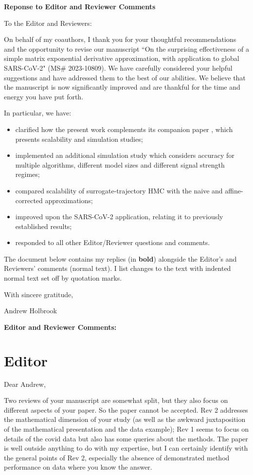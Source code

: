 \documentclass[12pt]{article}
\def\paperTitle{On the surprising effectiveness of a simple matrix exponential derivative approximation, with application to global SARS-CoV-2}
\def\paperID{MS\# 2023-10809}
\begin{document}


\centerline{\large \bf Reponse to Editor and Reviewer Comments}

To the Editor and Reviewers:

On behalf of my coauthors, I thank you for your thoughtful recommendations and the opportunity to revise our manuscript ``\paperTitle" (\paperID).
We have carefully considered your helpful suggestions and have addressed them to the best of our abilities.  We believe that the manuscript is now significantly improved and are thankful for the time and energy you have put forth.

In particular, we have:
\begin{itemize}
	\item clarified how the present work complements its companion paper \citet{magee2023random}, which presents scalability and simulation studies;
	
	\item implemented an additional simulation study which considers accuracy for multiple algorithms, different model sizes and different signal strength regimes;
	
    \item compared scalability of surrogate-trajectory HMC with the naive and affine-corrected approximations;
    
    \item improved upon the SARS-CoV-2 application, relating it to previously established results;
	
	\item responded to all other Editor/Reviewer questions and comments.
\end{itemize}


The document below contains my replies (in \textbf{bold}) alongside the Editor's and Reviewers' comments (normal text).  I list changes to the text with indented normal text set off by quotation marks.

With sincere gratitude,

Andrew Holbrook
\clearpage


{\Large \bf Editor and Reviewer Comments:}


\section*{Editor}

Dear Andrew, 

Two reviews of your manuscript are somewhat split, but they also focus on different aspects of your paper. So the paper cannot be accepted. Rev 2 addresses the mathematical dimension of your study (as well as the awkward juxtaposition of the mathematical presentation and the data example); Rev 1 seems to focus on details of the covid data but also has some queries about the methods. The paper is well outside anything to do with my expertise, but I can certainly identify with the general points of Rev 2, especially the absence of demonstrated method performance on data where you know the answer. 
\end{document}
